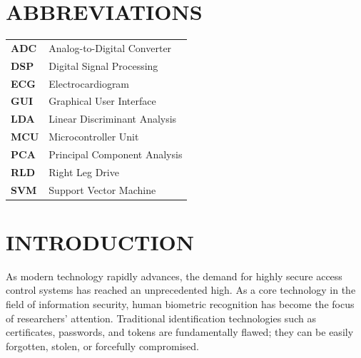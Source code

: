 \documentclass[12pt,a4paper]{report}
\begin{document}
\newpage
\renewcommand{\cftloftitlefont}{\hfill\normalfont\fontsize{16}{19}\bfseries}
\renewcommand{\cftafterloftitle}{\hfill\mbox{}}
\listoffigures

\newpage
\renewcommand{\cftlottitlefont}{\hfill\normalfont\fontsize{16}{19}\bfseries}
\renewcommand{\cftafterlottitle}{\hfill\mbox{}}
\listoftables
\newpage

\chapter*{ABBREVIATIONS}
\begin{flushleft}
\begin{tabular}{@{}p{2.5cm} l}
\textbf{ADC} & Analog-to-Digital Converter \\[0.2cm]
\textbf{DSP} & Digital Signal Processing \\[0.2cm]
\textbf{ECG} & Electrocardiogram \\[0.2cm]
\textbf{GUI} & Graphical User Interface \\[0.2cm]
\textbf{LDA} & Linear Discriminant Analysis \\[0.2cm]
\textbf{MCU} & Microcontroller Unit \\[0.2cm]
\textbf{PCA} & Principal Component Analysis \\[0.2cm]
\textbf{RLD} & Right Leg Drive \\[0.2cm]
\textbf{SVM} & Support Vector Machine \\
\end{tabular}
\end{flushleft}

\newpage
{}

\chapter{INTRODUCTION}
\vspace{10pt}
As modern technology rapidly advances, the demand for highly secure access control systems has reached an unprecedented high. As a core technology in the field of information security, human biometric recognition has become the focus of researchers' attention. Traditional identification technologies such as certificates, passwords, and tokens are fundamentally flawed; they can be easily forgotten, stolen, or forcefully compromised. \\
\end{document}
